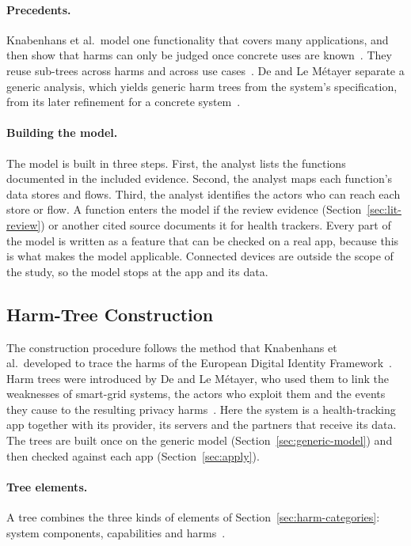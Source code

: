 \paragraph{Precedents.} Knabenhans et al.\ model one functionality that covers many
applications, and then show that harms can only be judged once concrete uses are
known~\parencite[\S4]{knabenhans2026harms}. They reuse sub-trees across harms and across
use cases~\parencite[\S4.2--4.3]{knabenhans2026harms}. De and Le Métayer separate a
generic analysis, which yields generic harm trees from the system's specification,
from its later refinement for a concrete
system~\parencite[\S\S3, 4.6, 5.4]{de2017refinement}.

\paragraph{Building the model.} The model is built in three steps. First, the analyst lists
the functions documented in the included evidence. Second, the analyst maps each function's
data stores and flows. Third, the analyst identifies the actors who can reach each store or
flow. A function enters the model if the review
evidence (Section~\ref{sec:lit-review}) or another cited source documents it for health
trackers. Every part of the model is written as a feature that can be checked on a real
app, because this is what makes the model applicable. Connected devices are outside the
scope of the study, so the model stops at the app and its data.

\subsection{Harm-Tree Construction}
\label{sec:harm-trees}
The construction procedure follows the method that Knabenhans et al.\ developed to trace the
harms of the European Digital Identity Framework~\parencite[\S4.1]{knabenhans2026harms}. Harm
trees were introduced by De and Le Métayer, who used them to link the weaknesses of smart-grid
systems, the actors who exploit them and the events they cause to the resulting privacy
harms~\parencite{de2016privacy}. Here the system is a health-tracking app
together with its provider, its servers and the partners that receive its
data. The trees are built once on the generic model
(Section~\ref{sec:generic-model}) and then checked against each app
(Section~\ref{sec:apply}).

\paragraph{Tree elements.} A tree combines the three kinds of elements of
Section~\ref{sec:harm-categories}: system components, capabilities and
harms~\parencite[\S4.1, Fig.~4]{knabenhans2026harms}.

